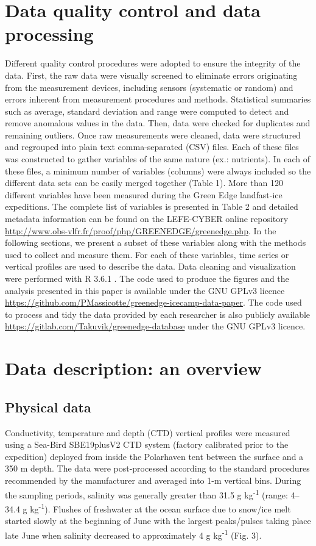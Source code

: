 \documentclass[essd, manuscript]{copernicus}
\begin{document}
\section{Data quality control and data processing}

Different quality control procedures were adopted to ensure the integrity of the data. First, the raw data were visually screened to eliminate errors originating from the measurement devices, including sensors (systematic or random) and errors inherent from measurement procedures and methods. Statistical summaries such as average, standard deviation and range were computed to detect and remove anomalous values in the data. Then, data were checked for duplicates and remaining outliers. Once raw measurements were cleaned, data were structured and regrouped into plain text comma-separated (CSV) files. Each of these files was constructed to gather variables of the same nature (ex.: nutrients). In each of these files, a minimum number of variables (columns) were always included so the different data sets can be easily merged together (Table 1). More than 120 different variables have been measured during the Green Edge landfast-ice expeditions. The complete list of variables is presented in Table 2 and detailed metadata information can be found on the LEFE-CYBER online repository \url{http://www.obs-vlfr.fr/proof/php/GREENEDGE/greenedge.php}. In the following sections, we present a subset of these variables along with the methods used to collect and measure them. For each of these variables, time series or vertical profiles are used to describe the data. Data cleaning and visualization were performed with R 3.6.1 \citep{RCoreTeam2019}. The code used to produce the figures and the analysis presented in this paper is available under the GNU GPLv3 licence \url{https://github.com/PMassicotte/greenedge-icecamp-data-paper}. The code used to process and tidy the data provided by each researcher is also publicly available \url{https://gitlab.com/Takuvik/greenedge-database} under the GNU GPLv3 licence.

\section{Data description: an overview}

\subsection{Physical data}

Conductivity, temperature and depth (CTD) vertical profiles were measured using a Sea-Bird SBE19plusV2 CTD system (factory calibrated prior to the expedition) deployed from inside the Polarhaven tent between the surface and a 350 m depth. The data were post-processed according to the standard procedures recommended by the manufacturer and averaged into 1-m vertical bins. During the sampling periods, salinity was generally greater than 31.5 g kg\textsuperscript{-1} (range: 4--34.4 g kg\textsuperscript{-1}). Flushes of freshwater at the ocean surface due to snow/ice melt started slowly at the beginning of June with the largest peaks/pulses taking place late June when salinity decreased to approximately 4 g kg\textsuperscript{-1} (Fig. 3). 
\end{document}
